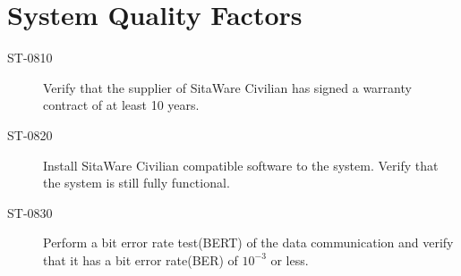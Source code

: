 \section{System Quality Factors}

\begin{description}
\item[ST-0810] Verify that the supplier of SitaWare Civilian has signed a warranty contract of at least 10 years.
\item[ST-0820] Install SitaWare Civilian compatible software to the system. Verify that the system is still fully functional. 
\item[ST-0830] Perform a bit error rate test(BERT) of the data communication and verify that it has a bit error rate(BER) of $10^{-3}$ or less. 
\end{description}
